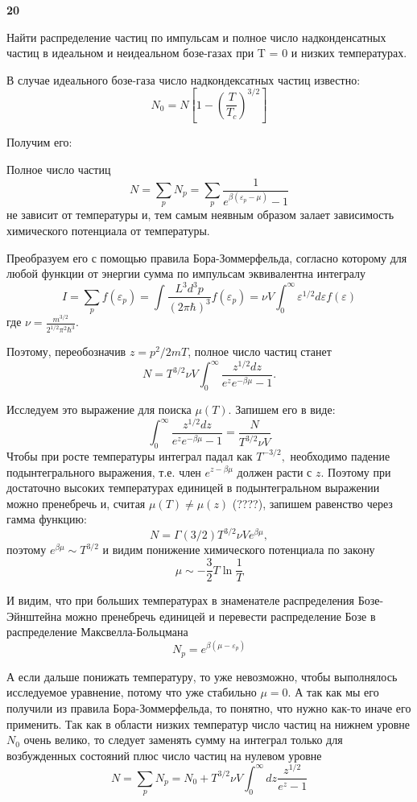 \documentclass[a4paper,12pt]{article} %
\begin{document}
\begin{ttask} \textbf{20}

Найти распределение частиц по импульсам и полное число надконденсатных частиц в идеальном и неидеальном бозе-газах при T = 0 и низких температурах.





В случае идеального бозе-газа число надкондексатных частиц известно:
\[ N_{0}=N\left[1-\left(\frac{T}{T_{c}}\right)^{3 / 2}\right] 
\]

Получим его:


Полное число частиц
$$
N=\sum_{p} N_{p}=\sum_{p} \frac{1}{e^{\beta\left(\varepsilon_{p}-\mu\right)}-1}
$$
не зависит от температуры и, тем самым неявным образом залает зависимость химического потенциала от температуры. 

Преобразуем его с помощью правила Бора-Зоммерфельда, согласно которому для любой функции 
от энергии сумма по импульсам эквивалентна интегралу
$$
I=
\sum_{p} f\left(\varepsilon_{p}\right)=
\int \frac{L^{3} d^{3} p}{(2 \pi \hbar)^{3}} f\left(\varepsilon_{p}\right)=
\nu V \int_{0}^{\infty} \varepsilon^{1 / 2} d \varepsilon f(\varepsilon)
$$
где $\nu=\frac{m^{3 / 2}}{2^{1 / 2} \pi^{2} \hbar^{3}} .$ 


Поэтому, переобозначив $z=p^{2} / 2 m T$, полное число частиц станет
$$
N=T^{3 / 2} \nu V \int_{0}^{\infty} \frac{z^{1 / 2} d z}{e^{z} e^{-\beta \mu}-1}.
$$


Исследуем это выражение для поиска $ \mu(T) $. 
Запишем его в виде:
$$
\int_{0}^{\infty} \frac{z^{1 / 2} d z}{e^{z} e^{-\beta \mu}-1}=\frac{N}{T^{3 / 2} \nu V}
$$
Чтобы при росте температуры интеграл падал как $T^{-3 / 2},$ необходимо падение подынтегрального выражения, 
т.е. член $e^{z-\beta \mu}$ должен расти с $z$.
Поэтому при достаточно высоких температурах единицей в 
подынтегральном выражении можно пренебречь и, считая $ \mu(T)\ne \mu(z)$ (????), 
запишем равенство через гамма функцию:
%
$$
N=\Gamma(3 / 2) T^{3 / 2} \nu V e^{\beta \mu},
$$
поэтому $e^{\beta \mu} \sim T^{3 / 2}$ и видим понижение химического потенциала по закону
$$
\mu \sim-\frac{3}{2} T \ln \frac{1}{T}
$$

И видим, что при больших температурах в знаменателе распределения Бозе-Эйнштейна можно пренебречь единицей и перевести 
распределение Бозе в распределение Максвелла-Больцмана
$$
N_{p}=e^{\beta\left(\mu-\varepsilon_{p}\right)}
$$


А если дальше понижать температуру, то уже невозможно, чтобы выполнялось исследуемое уравнение, 
потому что уже стабильно $\mu=0 .$ 
А так как мы его получили из правила Бора-Зоммерфельда, то понятно, что нужно как-то иначе его применить.
Так как в области низких температур число частиц на нижнем уровне $N_{0}$ очень велико, 
то следует заменять сумму на интеграл только для возбужденных состояний плюс число частиц на нулевом уровне
$$
N=\sum_{p} N_{p}
=
N_{0}+T^{3 / 2} \nu V 
\int_{0}^{\infty} d z 
\frac{z^{1 / 2}}{e^{z}-1}
$$



\end{ttask}
\end{document}
